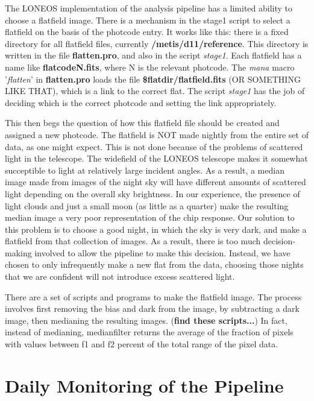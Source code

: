 \documentclass{article}
\newcommand{\note}[1]{({\bf #1})}
\newcommand\pr{\em}                   %
\newcommand\ff{\bf}                   %
\begin{document}
The LONEOS implementation of the analysis pipeline has a limited
ability to choose a flatfield image.  There is a mechanism in the
stage1 script to select a flatfield on the basis of the photcode
entry.  It works like this: there is a fixed directory for all
flatfield files, currently {\ff /metis/d11/reference}.  This directory
is written in the file {\ff flatten.pro}, and also in the script {\pr
stage1}.  Each flatfield has a name like {\ff flatcodeN.fits}, where N
is the relevant photcode.  The {\pr mana} macro '{\pr flatten}' in
{\ff flatten.pro} loads the file {\ff \$flatdir/flatfield.fits} (OR
SOMETHING LIKE THAT), which is a link to the correct flat.  The script
{\pr stage1} has the job of deciding which is the correct photcode and
setting the link appropriately.

This then begs the question of how this flatfield file should be
created and assigned a new photcode.  The flatfield is NOT made
nightly from the entire set of data, as one might expect.  This is not
done because of the problems of scattered light in the telescope.  The
widefield of the LONEOS telescope makes it somewhat succeptible to
light at relatively large incident angles.  As a result, a median
image made from images of the night sky will have different amounts of
scattered light depending on the overall sky brightness.  In our
experience, the presence of light clouds and just a small moon (as
little as a quarter) make the resulting median image a very poor
representation of the chip response.  Our solution to this problem is
to choose a good night, in which the sky is very dark, and make a
flatfield from that collection of images.  As a result, there is too
much decision-making involved to allow the pipeline to make this
decision.  Instead, we have chosen to only infrequently make a new
flat from the data, choosing those nights that we are confident will
not introduce excess scattered light.  

There are a set of scripts and programs to make the flatfield image.
The process involves first removing the bias and dark from the image,
by subtracting a dark image, then medianing the resulting images.
\note{find these scripts...}  In fact, instead of medianing,
medianfilter returns the average of the fraction of pixels with values
between f1 and f2 percent of the total range of the pixel data.

\section{Daily Monitoring of the Pipeline}
\end{document}

